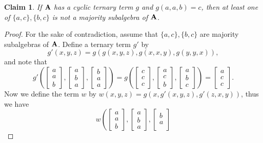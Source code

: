 \documentclass[11pt]{amsart}
\newcommand{\m}[1]{\mathbf{\uppercase{#1}}}
\theoremstyle{definition}
\theoremstyle{remark}
\theoremstyle{plain}
\newtheorem{claim}[thm]{Claim}
\begin{document}
\begin{claim}\label{bar1nijemajclaim}
If $\m a$ has a cyclic ternary term $g$ and $g(a,a,b)=c$, then at least one of $\{a,c\},\{b,c\}$ is not a majority subalgebra of $\m a$.
\end{claim}
\begin{proof}
For the sake of contradiction, assume that $\{a,c\},\{b,c\}$ are majority subalgebras of $\m a$. Define a ternary term $g'$ by $$g'(x,y,z)=g(g(x,y,z),g(x,x,y),g(y,y,x)),$$ and note that
$$
g'\left(
\begin{bmatrix}
a \\
a \\
b
\end{bmatrix}\!,\!
\begin{bmatrix}
a \\
b \\
a
\end{bmatrix}\!,\!
\begin{bmatrix}
b \\
a \\
a
\end{bmatrix}
\right)=g\left(
\begin{bmatrix}
c \\
c \\
c
\end{bmatrix}\!,\!
\begin{bmatrix}
a \\
c \\
b
\end{bmatrix}\!,\!
\begin{bmatrix}
a \\
b \\
c
\end{bmatrix}
\right)=
\begin{bmatrix}
a \\
c \\
c
\end{bmatrix}.
$$
Now we define the term $w$ by $w(x,y,z)=g(x,g'(x,y,z),g'(z,x,y))$, thus we have 
$$
w\left(
\begin{bmatrix}
a \\
a \\
b
\end{bmatrix}\!,\!
\begin{bmatrix}
a \\
b \\
a
\end{bmatrix}\!,\!
\begin{bmatrix}
b \\
a \\

\end{bmatrix}$$
\end{proof}
\end{document}
